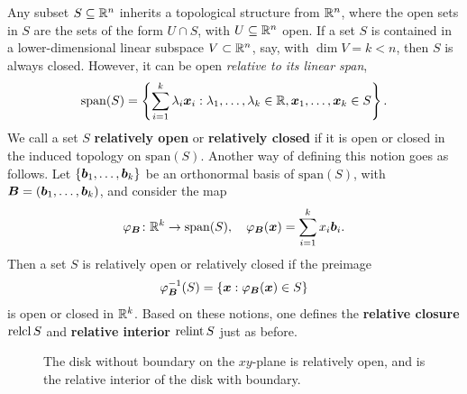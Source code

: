 \documentclass[11pt,a4paper]{memoir}
\begin{document}
Any subset $S\subseteq \mathbb{R}^n$ inherits a topological structure from $\mathbb{R}^n$, where the open sets in $S$ are the sets of the form $U\cap S$, with $U\subseteq \mathbb{R}^n$ open. 
If a set $S$ is contained in a lower-dimensional linear subspace $V\subset \mathbb{R}^n$, say, with $\dim V=k<n$, then $S$ is always closed. However, it can be open {\em relative to its linear span},
\begin{equation*}
 \mathrm{span}(S) = \left\{\sum_{i=1}^k \lambda_i \bm{x}_i \mathrel{\mathop{:}} \lambda_1,\dots,\lambda_k\in \mathbb{R}, \bm{x}_1,\dots,\bm{x}_k\in S\right\}.
\end{equation*}
We call a set $S$ \textbf{relatively open} or \textbf{relatively closed} if it is open or closed in the induced topology on $\mathrm{span}(S)$. Another way of defining this notion goes as follows.
Let $\{\bm{b}_1,\dots,\bm{b}_k\}$ be an orthonormal basis of $\mathrm{span}(S)$, with $\bm{B}=(\bm{b}_1,\dots,\bm{b}_k)$, and consider the map
\begin{equation*}
 \varphi_{\bm{B}}\colon \mathbb{R}^k \to \mathrm{span}(S),\quad \varphi_{\bm{B}}(\bm{x})=\sum_{i=1}^k x_i \bm{b}_i.
\end{equation*}
Then a set $S$ is relatively open or relatively closed if the preimage 
\begin{equation*}
\varphi_{\bm{B}}^{-1}(S) = \{\bm{x} \mathrel{\mathop{:}} \varphi_{\bm{B}}(\bm{x})\in S\}
\end{equation*}
is open or closed in $\mathbb{R}^k$. Based on these notions, one defines the \textbf{relative closure} $\operatorname{relcl} S$ and \textbf{relative interior} $\operatorname{relint} S$ just as before.

\begin{figure}[h!]
\centering
{}
\caption{The disk without boundary on the $xy$-plane is relatively open, and is the relative interior of the disk with boundary.} 
\end{figure}
\end{document}

